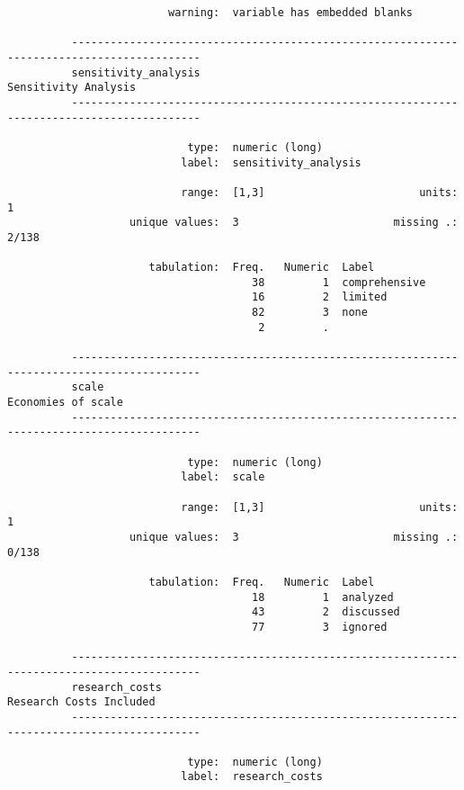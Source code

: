 \documentclass{article}
\begin{document}
\begin{verbatim}
                         warning:  variable has embedded blanks
          
          ------------------------------------------------------------------------------------------
          sensitivity_analysis                                                  Sensitivity Analysis
          ------------------------------------------------------------------------------------------
          
                            type:  numeric (long)
                           label:  sensitivity_analysis
          
                           range:  [1,3]                        units:  1
                   unique values:  3                        missing .:  2/138
          
                      tabulation:  Freq.   Numeric  Label
                                      38         1  comprehensive
                                      16         2  limited
                                      82         3  none
                                       2         .  
          
          ------------------------------------------------------------------------------------------
          scale                                                                   Economies of scale
          ------------------------------------------------------------------------------------------
          
                            type:  numeric (long)
                           label:  scale
          
                           range:  [1,3]                        units:  1
                   unique values:  3                        missing .:  0/138
          
                      tabulation:  Freq.   Numeric  Label
                                      18         1  analyzed
                                      43         2  discussed
                                      77         3  ignored
          
          ------------------------------------------------------------------------------------------
          research_costs                                                     Research Costs Included
          ------------------------------------------------------------------------------------------
          
                            type:  numeric (long)
                           label:  research_costs
          

\end{verbatim}
\end{document}
